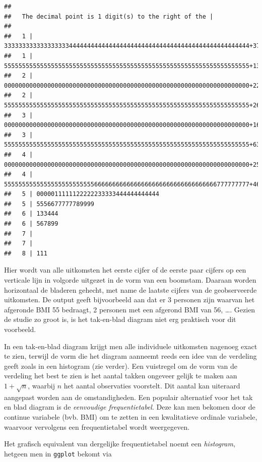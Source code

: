 \documentclass[
  12pt,dutch,coursenotes]{book}
\newcommand{\passthrough}[1]{#1}
\theoremstyle{definition}
\theoremstyle{definition}
\theoremstyle{definition}
\theoremstyle{definition}
\theoremstyle{remark}
\begin{document}
\begin{lstlisting}
## 
##   The decimal point is 1 digit(s) to the right of the |
## 
##   1 | 33333333333333333344444444444444444444444444444444444444444444444444+37
##   1 | 55555555555555555555555555555555555555555555555555555555555555555555+1389
##   2 | 00000000000000000000000000000000000000000000000000000000000000000000+2264
##   2 | 55555555555555555555555555555555555555555555555555555555555555555555+2610
##   3 | 00000000000000000000000000000000000000000000000000000000000000000000+1693
##   3 | 55555555555555555555555555555555555555555555555555555555555555555555+635
##   4 | 00000000000000000000000000000000000000000000000000000000000000000000+255
##   4 | 55555555555555555555555556666666666666666666666666666666666777777777+46
##   5 | 0000011111122222233333444444444444
##   5 | 5556677777789999
##   6 | 133444
##   6 | 567899
##   7 | 
##   7 | 
##   8 | 111
\end{lstlisting}

Hier wordt van alle uitkomsten het eerste cijfer of de eerste paar cijfers
op een verticale lijn in volgorde uitgezet in de vorm van een boomstam.
Daaraan worden horizontaal de bladeren gehecht, met name de laatste cijfers
van de geobserveerde uitkomsten. De output geeft bijvoorbeeld aan dat er 3 personen zijn waarvan het afgeronde BMI 55 bedraagt, 2 personen met een afgerond BMI van 56, \ldots.
Gezien de studie zo groot is, is het tak-en-blad diagram niet erg praktisch voor dit voorbeeld.

In een tak-en-blad diagram krijgt men alle individuele uitkomsten nagenoeg
exact te zien, terwijl de vorm die het diagram aanneemt reeds een idee van
de verdeling geeft zoals in een histogram (zie verder). Een vuistregel om de
vorm van de verdeling het best te zien is het aantal takken ongeveer gelijk
te maken aan \(1 + \sqrt{n}\), waarbij \(n\) het aantal observaties voorstelt.
Dit aantal kan uiteraard aangepast worden aan de omstandigheden.
Een populair alternatief voor het tak en blad diagram is de \emph{eenvoudige frequentietabel}. Deze kan men bekomen door de continue variabele (bvb. BMI) om te zetten in een kwalitatieve ordinale variabele, waarvoor vervolgens een frequentietabel wordt weergegeven.

Het grafisch equivalent van dergelijke frequentietabel noemt een \emph{histogram}, hetgeen men in \passthrough{\lstinline!ggplot!} bekomt via
\end{document}
